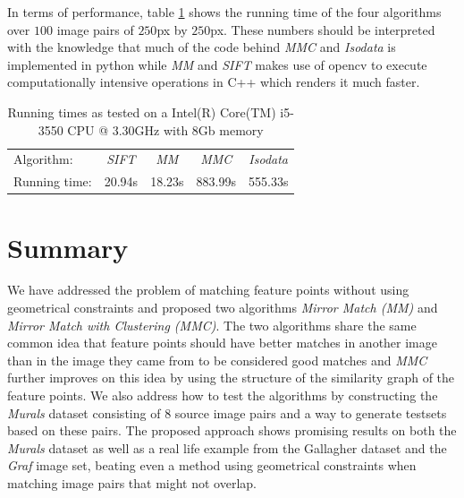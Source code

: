 \documentclass[12pt,journal,compsoc]{IEEEtran}
\begin{document}
In terms of performance, table \ref{table:running_times} shows the 
running time of the four algorithms over $100$ image pairs of $250$px by 
$250$px. These numbers should be interpreted with the knowledge that 
much of the code behind \emph{MMC} and \emph{Isodata} is implemented in 
python while \emph{MM} and \emph{SIFT} makes use of opencv to execute 
computationally intensive operations in C++ which renders it much 
faster.
%
\begin{savenotes}
\begin{table}
	\centering
	\small
\begin{tabular}{l*{4}{c}}
	Algorithm: & \emph{SIFT} & \emph{MM} & \emph{MMC} & \emph{Isodata} 
	\\
	\noalign{\smallskip} 
	Running time: & 20.94s & 18.23s & 883.99s & 555.33s \\
\end{tabular}
\caption{Running times as tested on a Intel(R) Core(TM) i5-3550 CPU @ 
3.30GHz with 8Gb memory}
\label{table:running_times}
\end{table}
\end{savenotes}
%
\section{Summary}
We have addressed the problem of matching feature points without using 
geometrical constraints and proposed two algorithms \emph{Mirror Match 
(MM)} and \emph{Mirror Match with Clustering (MMC)}. The two algorithms 
share the same common idea that feature points should have better 
matches in another image than in the image they came from to be 
considered good matches and \emph{MMC} further improves on this idea by 
using the structure of the similarity graph of the feature points. We 
also address how to test the algorithms by constructing the 
\emph{Murals} dataset consisting of $8$ source image pairs and a way to 
generate testsets based on these pairs.  The proposed approach shows 
promising results on both the \emph{Murals} dataset as well as a real 
life example from the Gallagher dataset and the \emph{Graf} image set, 
beating even a method using geometrical constraints when matching image 
pairs that might not overlap.
%


\end{document}
